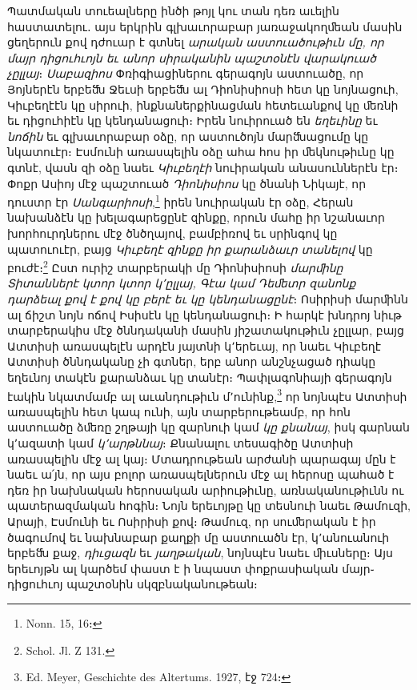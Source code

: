 \documentclass{article}
\begin{document}
{Պատմական տուեալները ինծի թոյլ կու տան դեռ աւելին հաստատելու․ այս երկրին գլխաւորաբար յառաջակողﬔան մասին ցեղերուն քով դժուար է գտնել \emph{արական աստուածութիւն մը, որ մայր դիցուհւոյն եւ անոր սիրականին պաշտօնէն վարակուած չըլլայ}։ \emph{Սաբազիոս} Փռիգիացիներու գերագոյն աստուածը, որ Յոյներէն երբեﬓ Ջեւսի երբեﬓ ալ Դիոնիսիոսի հետ կը նոյնացուի, Կիւբեղէէն կը սիրուի, ինքնաներքինացման հետեւանքով կը ﬔռնի եւ դիցուհիէն կը կենդանացուի։ Իրեն նուիրուած են \emph{եղեւինը} եւ \emph{նոճին} եւ գլխաւորաբար օձը, որ աստուծոյն մարﬓացումը կը նկատուէր։ Էսմունի առասպելին օձը ահա հոս իր ﬔկնութիւնը կը գտնէ, վասն զի օձը նաեւ \emph{Կիւբեղէի} նուիրական անասուններէն էր։ Փոքր Ասիոյ մէջ պաշտուած \emph{Դիոնիսիոս} կը ծնանի Նիկայէ, որ դուստր էր \emph{Սանգարիոսի},\footnote{Nonn. 15, 16։} իրեն նուիրական էր օձը, Հերան նախանձէն կը խելագարեցընէ զինքը, որուն մահը իր նշանաւոր խորհուրդներու մէջ ծնծղայով, բամբիռով եւ սրինգով կը պատուուէր, բայց \emph{Կիւբեղէ զինքը իր քարանձաւր տանելով} կը բուժէ։\footnote{Schol. Jl. Z 131.} Ըստ ուրիշ տարբերակի մը Դիոնիսիոսի \emph{մարﬕնը Տիտաններէ կտոր կտոր կ՚ըլլայ, Գէա կամ Դեﬔտր զանոնք դարձեալ քով է քով կը բերէ եւ կը կենդանացընէ}։ Ոսիրիսի մարﬕնն ալ ճիշտ նոյն ոճով Իսիսէն կը կենդանացուի։ Ի հարկէ խնդրոյ նիւթ տարբերակիս մէջ ծննդականի մասին յիշատակութիւն չըլլար, բայց Ատտիսի առասպելէն արդէն յայտնի կ՚երեւայ, որ նաեւ Կիւբեղէ Ատտիսի ծննդականը չի գտներ, երբ անոր անշնչացած դիակը եղեւնոյ տակէն քարանձաւ կը տանէր։ Պափլագոնիայի գերագոյն էակին նկատմամբ ալ աւանդութիւն մ՚ունինք,\footnote{Ed. Meyer, Geschichte des Altertums. 1927, էջ 724։} որ նոյնպէս Ատտիսի առասպելին հետ կապ ունի, այն տարբերութեամբ, որ հոն աստուածը ձﬔռը շղթայի կը զարնուի կամ \emph{կը քնանայ}, իսկ գարնան կ՚ազատի կամ \emph{կ՚արթննայ}։ Քնանալու տեսագիծը Ատտիսի առասպելին մէջ ալ կայ։ Մտադրութեան արժանի պարագայ մըն է նաեւ ա՛յն, որ այս բոլոր առասպելներուն մէջ ալ հերոսը պահած է դեռ իր նախնական հերոսական արիութիւնը, առնականութիւնն ու պատերազմական հոգին։ Նոյն երեւոյթը կը տեսնուի նաեւ Թամուզի, Արայի, Էսմունի եւ Ոսիրիսի քով։ Թամուզ, որ սուﬔրական է իր ծագումով եւ նախնաբար քաղքի մը աստուածն էր, կ՚անուանուի երբեﬓ քաջ, \emph{դիւցազն} եւ \emph{յաղթական}, նոյնպէս նաեւ ﬕւսները։ Այս երեւոյթն ալ կարծեմ փաստ է ի նպաստ փոքրասիական մայր֊դիցուհւոյ պաշտօնին սկզբնականութեան։

}
\end{document}
